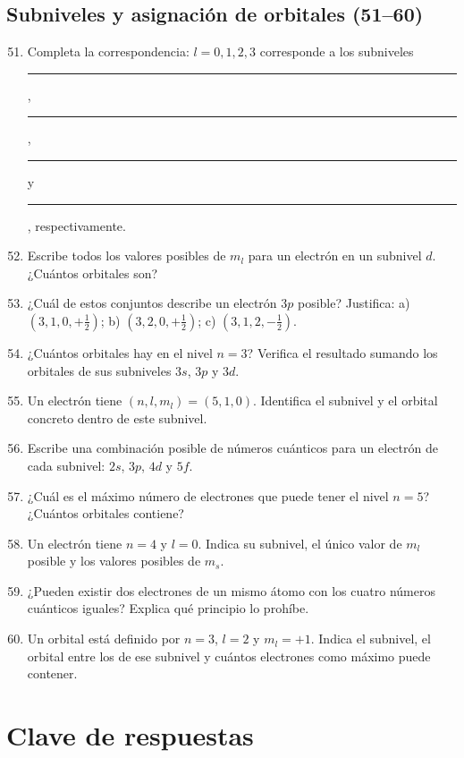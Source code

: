 \documentclass[12pt, letterpaper]{article}
\begin{document}
\subsection{Subniveles y asignación de orbitales (51--60)}
\begin{enumerate}[leftmargin=*, label=\textbf{\arabic*.}]
  \setcounter{enumi}{50}
  \item \facil{} Completa la correspondencia: $l=0,1,2,3$ corresponde a los subniveles \rule{2cm}{0.4pt}, \rule{2cm}{0.4pt}, \rule{2cm}{0.4pt} y \rule{2cm}{0.4pt}, respectivamente.
  \item \medio{} Escribe todos los valores posibles de $m_l$ para un electrón en un subnivel $d$. ¿Cuántos orbitales son?
  \item \medio{} ¿Cuál de estos conjuntos describe un electrón $3p$ posible? Justifica: a) $(3,1,0,+\tfrac12)$; b) $(3,2,0,+\tfrac12)$; c) $(3,1,2,-\tfrac12)$.
  \item \facil{} ¿Cuántos orbitales hay en el nivel $n=3$? Verifica el resultado sumando los orbitales de sus subniveles $3s$, $3p$ y $3d$.
  \item \medio{} Un electrón tiene $(n,l,m_l)=(5,1,0)$. Identifica el subnivel y el orbital concreto dentro de este subnivel.
  \item \medio{} Escribe una combinación posible de números cuánticos para un electrón de cada subnivel: $2s$, $3p$, $4d$ y $5f$.
  \item \dificil{} ¿Cuál es el máximo número de electrones que puede tener el nivel $n=5$? ¿Cuántos orbitales contiene?
  \item \medio{} Un electrón tiene $n=4$ y $l=0$. Indica su subnivel, el único valor de $m_l$ posible y los valores posibles de $m_s$.
  \item \medio{} ¿Pueden existir dos electrones de un mismo átomo con los cuatro números cuánticos iguales? Explica qué principio lo prohíbe.
  \item \dificil{} Un orbital está definido por $n=3$, $l=2$ y $m_l=+1$. Indica el subnivel, el orbital entre los de ese subnivel y cuántos electrones como máximo puede contener.
\end{enumerate}

\newpage
\ifmwclaves
\section{Clave de respuestas}
\end{document}
